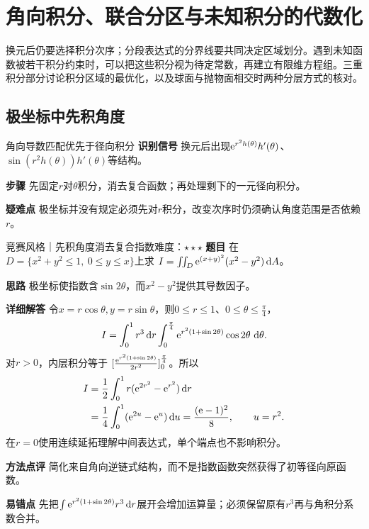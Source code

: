\section{角向积分、联合分区与未知积分的代数化}\label{cmi:section}
\begin{examtip}
换元后仍要选择积分次序；分段表达式的分界线要共同决定区域划分。遇到未知函数被若干积分约束时，可以把这些积分视为待定常数，再建立有限维方程组。三重积分部分讨论积分区域的最优化，以及球面与抛物面相交时两种分层方式的核对。
\end{examtip}

\subsection{极坐标中先积角度}\label{cmi:angular}
\begin{method}{角向导数匹配优先于径向积分}
\textbf{识别信号} 换元后出现$\mathrm{e}^{r^2h(\theta)}h'(\theta)$、$\sin(r^2h(\theta))h'(\theta)$等结构。\par
\textbf{步骤} 先固定$r$对$\theta$积分，消去复合函数；再处理剩下的一元径向积分。\par
\textbf{疑难点} 极坐标并没有规定必须先对$r$积分，改变次序时仍须确认角度范围是否依赖$r$。
\end{method}
\begin{example}{竞赛风格｜先积角度消去复合指数}{难度：$\star\star\star$}
\label{cmi:ex:angular}
\textbf{题目} 在$D=\{x^2+y^2\le1,\ 0\le y\le x\}$上求
$I=\iint_D\mathrm{e}^{(x+y)^2}(x^2-y^2)\mathop{}\!\mathrm{d} A$。\par
\textbf{思路} 极坐标使指数含$\sin2\theta$，而$x^2-y^2$提供其导数因子。\par
\textbf{详细解答} 令$x=r\cos\theta,y=r\sin\theta$，则$0\le r\le1$、$0\le\theta\le\frac{\pi}{4}$，
\[
I=\int_0^1r^3\mathop{}\!\mathrm{d} r
\int_0^{\frac{\pi}{4}}\mathrm{e}^{r^2(1+\sin2\theta)}\cos2\theta\,\mathop{}\!\mathrm{d}\theta.
\]
对$r>0$，内层积分等于
$[\frac{\mathrm{e}^{r^2(1+\sin2\theta)}}{2r^2}]_0^{\frac{\pi}{4}}$。所以
\[
\begin{aligned}
I&=\dfrac12\int_0^1r(\mathrm{e}^{2r^2}-\mathrm{e}^{r^2})\mathop{}\!\mathrm{d} r\\
 &=\dfrac14\int_0^1(\mathrm{e}^{2u}-\mathrm{e}^u)\mathop{}\!\mathrm{d} u
 =\dfrac{(\mathrm{e}-1)^2}{8},\qquad u=r^2.
\end{aligned}
\]
在$r=0$使用连续延拓理解中间表达式，单个端点也不影响积分。\par
\textbf{方法点评} 简化来自角向逆链式结构，而不是指数函数突然获得了初等径向原函数。\par
\textbf{易错点} 先把$\int\mathrm{e}^{r^2(1+\sin2\theta)}r^3\mathop{}\!\mathrm{d} r$展开会增加运算量；必须保留原有$r^3$再与角积分系数合并。
\end{example}

